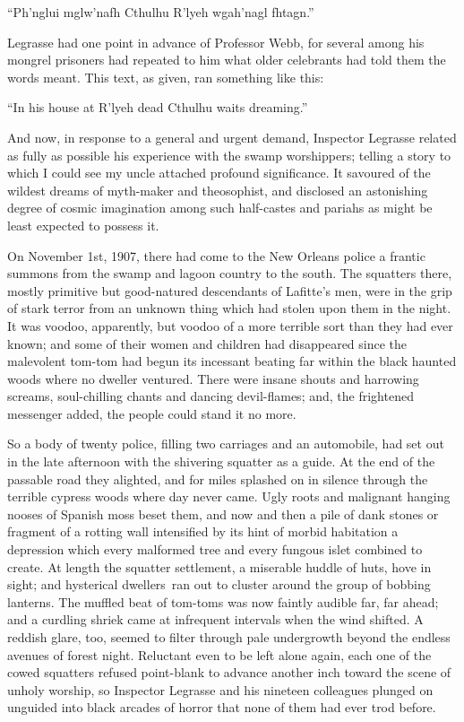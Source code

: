 ``Ph'nglui mglw'nafh Cthulhu R'lyeh wgah'nagl fhtagn.''

Legrasse had one point in advance of Professor Webb, for several among
his mongrel prisoners had repeated to him what older celebrants had told
them the words meant. This text, as given, ran something like this:

``In his house at R'lyeh dead Cthulhu waits dreaming.''

And now, in response to a general and urgent demand, Inspector Legrasse
related as fully as possible his experience with the swamp worshippers;
telling a story to which I could see my uncle attached profound
significance. It savoured of the wildest dreams of myth-maker and
theosophist, and disclosed an astonishing degree of cosmic imagination
among such half-castes and pariahs as might be least expected to possess
it.

\pagebreak

On November 1st, 1907, there had come to the New Orleans police a
frantic summons from the swamp and lagoon country to the south. The
squatters there, mostly primitive but good-natured descendants of
Lafitte's men, were in the grip of stark terror from an unknown thing
which had stolen upon them in the night. It was voodoo, apparently, but
voodoo of a more terrible sort than they had ever known; and some of
their women and children had disappeared since the malevolent tom-tom
had begun its incessant beating far within the black haunted woods where
no dweller ventured. There were insane shouts and harrowing screams,
soul-chilling chants and dancing devil-flames; and, the frightened
messenger added, the people could stand it no more.

So a body of twenty police, filling two carriages and an automobile, had
set out in the late afternoon with the shivering squatter as a guide. At
the end of the passable road they alighted, and for miles splashed on in
silence through the terrible cypress woods where day never came. Ugly
roots and malignant hanging nooses of Spanish moss beset them, and now
and then a pile of dank stones or fragment of a rotting wall intensified
by its hint of morbid habitation a depression which every malformed tree
and every fungous islet combined to create. At length the squatter
settlement, a miserable huddle of huts, hove in sight; and hysterical
dwellers\est\ ran out to cluster around the group of bobbing lanterns. The
muffled beat of tom-toms was now faintly audible far, far ahead; and a
curdling shriek came at infrequent intervals when the wind shifted. A
reddish glare, too, seemed to filter through pale undergrowth beyond the
endless avenues of forest night. Reluctant even to be left alone again,
each one of the cowed squatters refused point-blank to advance another
inch toward the scene of unholy worship, so Inspector Legrasse and his
nineteen colleagues plunged on unguided into black arcades of horror
that none of them had ever trod before.

